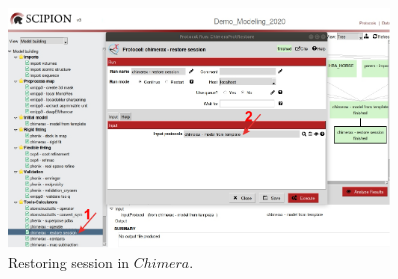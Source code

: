  \begin{figure}[H]
  \centering 
  \captionsetup{width=.7\linewidth} 
  \includegraphics[width=0.90\textwidth]{Images/Fig17}
  \caption{Restoring session in $Chimera$.}
  \label{fig:restore_session_protocol}
  \end{figure}
